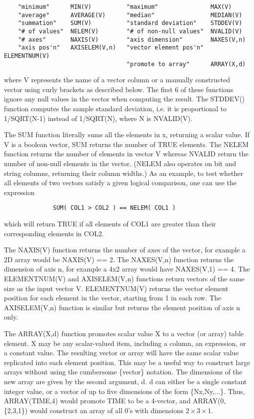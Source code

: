 \documentclass[11pt]{book}
\begin{document}
\begin{verbatim}
    "minimum"      MIN(V)          "maximum"               MAX(V)
    "average"      AVERAGE(V)      "median"                MEDIAN(V)
    "summation"    SUM(V)          "standard deviation"    STDDEV(V)
    "# of values"  NELEM(V)        "# of non-null values"  NVALID(V)
    "# axes"       NAXIS(V)        "axis dimension"        NAXES(V,n)
    "axis pos'n"   AXISELEM(V,n)   "vector element pos'n"  ELEMENTNUM(V)
                                   "promote to array"      ARRAY(X,d)
\end{verbatim}
    where V represents the name of a vector column or a manually
    constructed vector using curly brackets as described below.  The
    first 6 of these functions ignore any null values in the vector when
    computing the result.  The STDDEV() function computes the sample
    standard deviation, i.e. it is proportional to 1/SQRT(N-1) instead
    of 1/SQRT(N), where N is NVALID(V).

    The SUM function literally sums all  the elements in x,  returning a
    scalar value.   If V  is  a  boolean  vector, SUM returns the number
    of TRUE elements. The NELEM function  returns the number of elements
    in vector V whereas NVALID return the number of non-null elements in
    the  vector.   (NELEM  also  operates  on  bit  and string  columns,
    returning their column widths.)  As an example, to  test whether all
    elements of two vectors satisfy a  given logical comparison, one can
    use the expression

\begin{verbatim}
              SUM( COL1 > COL2 ) == NELEM( COL1 )
\end{verbatim}

    which will return TRUE if all elements  of  COL1  are  greater  than
    their corresponding elements in COL2.

    The NAXIS(V) function returns the number of axes of the vector,
    for example a 2D array would be NAXIS(V) == 2.  The NAXES(V,n)
    function returns the dimension of axis n, for example a 4x2 array
    would have NAXES(V,1) == 4.  The ELEMENTNUM(V) and AXISELEM(V,n)
    functions return vectors of the same size as the input vector V.
    ELEMENTNUM(V) returns the vector element position for each element
    in the vector, starting from 1 in each row.  The AXISELEM(V,n)
    function is similar but returns the element position of axis n
    only.

    The ARRAY(X,d) function promotes scalar value X to a vector (or
    array) table element.  X may be any scalar-valued item, including
    a column, an expression, or a constant value.  The resulting
    vector or array will have the same scalar value replicated into
    each element position.  This may be a useful way to construct
    large arrays without using the cumbersome \{vector\} notation. The
    dimensions of the new array are given by the second argument, d.
    d can either be a single constant integer value, or a vector of up
    to five dimensions of the form \{Nx,Ny,...\}.  Thus, ARRAY(TIME,4)
    would promote TIME to be a 4-vector, and ARRAY(0, \{2,3,1\}) would
    construct an array of all 0's with dimensions $2\times 3\times 1$.
\end{document}
